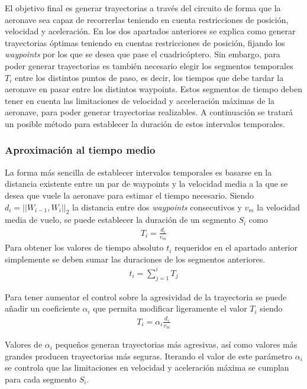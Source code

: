 El objetivo final es generar trayectorias a través del circuito de forma que la aeronave sea capaz de recorrerlas teniendo en cuenta restricciones de posición, velocidad y aceleración. En los dos apartados anteriores se explica como generar trayectorias óptimas teniendo en cuentas restricciones de posición, fijando los \textit{waypoints} por los que se desea que pase el cuadricóptero. Sin embargo, para poder generar trayectorias es también necesario elegir los segmentos temporales $T_i$ entre los distintos puntos de paso, es decir, los tiempos que debe tardar la aeronave en pasar entre los distintos waypoints. Estos segmentos de tiempo deben tener en cuenta las limitaciones de velocidad y acceleración máximas de la aeronave, para poder generar trayectorias realizables. A continuación se tratará un posible método para establecer la duración de estos intervalos temporales.

\subsubsection{Aproximación al tiempo medio}

La forma más sencilla de establecer intervalos temporales es basarse en la distancia existente entre un par de waypoints y la velocidad media a la que se desea que vuele la aeronave para estimar el tiempo necesario. Siendo $d_i = || W_{i-1} , W_{i} ||_2 $ la distancia entre dos \textit{waypoints} consecutivos y $v_m$ la velocidad media de vuelo, se puede establecer la duración de un segmento $S_i$ como
\begin{align}
	T_i = \frac{d_i}{v_m}
\end{align}
Para obtener los valores de tiempo absoluto $t_i$ requeridos en el apartado anterior simplemente se deben sumar las duraciones de los segmentos anteriores.
\begin{align}
t_i = \sum_{j=1}^{i} T_j
\end{align}


Para tener aumentar el control sobre la agresividad de la trayectoria se puede añadir un coeficiente $\alpha_i$ que permita modificar ligeramente el valor $T_i$ siendo 
\begin{align}
	T_i = \alpha_i\frac{d_i}{v_m}
\end{align}

Valores de $\alpha_i$ pequeños generan trayectorias más agresivas, así como valores más grandes producen trayectorias más seguras. Iterando el valor de este parámetro $\alpha_i$ se controla que las limitaciones en velocidad y aceleración máxima se cumplan para cada segmento $S_i$.

